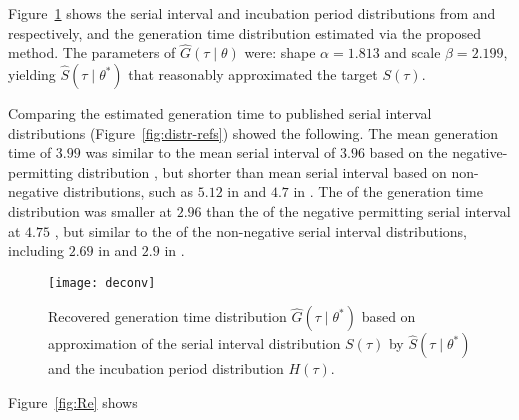 Figure~\ref{fig:deconv} shows the
serial interval and incubation period distributions
from \cite{Du2020} and \cite{Lauer2020} respectively,
and the generation time distribution estimated via the proposed method.
The \mle parameters of $\hat{G}(\tau\mid\theta)$ were:
shape ${\alpha = 1.813}$ and scale ${\beta = 2.199}$,
yielding $\hat{S}(\tau\mid\theta^*)$
that reasonably approximated the target $S(\tau)$.
\par
Comparing the estimated generation time to published serial interval distributions
(Figure~\ref{fig:distr-refs}) showed the following.
The mean generation time of $3.99$ was similar to
the mean serial interval of $3.96$
based on the negative-permitting distribution \cite{Du2020},
but shorter than mean serial interval based on non-negative distributions,
such as $5.12$ in \cite{Zhang2020} and $4.7$ in \cite{Nishiura2020}.
The \sd of the generation time distribution was smaller at $2.96$
than the \sd of the negative permitting serial interval at $4.75$ \cite{Du2020},
but similar to the \sd of the non-negative serial interval distributions,
including $2.69$ in \cite{Zhang2020} and $2.9$ in \cite{Nishiura2020}.
\par
\begin{figure}
  \centering
  \texttt{[image: deconv]}
  \caption{Recovered generation time distribution
    $\hat{G}(\tau\mid\theta^*)$
    based on \mle approximation of the serial interval distribution
    $S(\tau)$ by $\hat{S}(\tau\mid\theta^*)$
    and the incubation period distribution $H(\tau)$.}
  \label{fig:deconv}
\end{figure}
\par
Figure~\ref{fig:Re} shows
